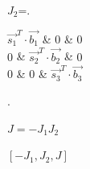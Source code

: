 \begin{algorithm}[H]
{              
              $J_{2}$=\left.    
              \begin{bmatrix}
                 $\overrightarrow{s_{1}}^T \cdot \overrightarrow{b_{1}} $ & $0$ & $0$\\
                $0$ & $\overrightarrow{s_{2}}^T \cdot \overrightarrow{b_{2}}$ & $0$\\
                $0$ & $0$ & $\overrightarrow{s_{3}}^T \cdot \overrightarrow{b_{3}}$
            \end{bmatrix}
            \right.

                $J=-J_{1}J_{2}$\;
                
               
              \KwRet $[-J_{1},J_{2},J]$   }
        \end{algorithm}
 

